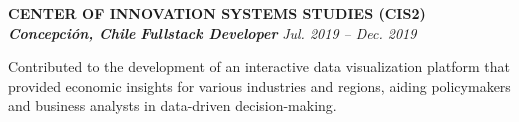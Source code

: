 \item
\headerrow
{\textbf{\uppercase{Center of Innovation Systems Studies (CIS2)}}}
{\textbf{\emph{Concepción, Chile}}}
\headerrow
{\textbf{\emph{Fullstack Developer}}}
{\emph{Jul. 2019 -- Dec. 2019}}
\begin{itemize*}
    \item Contributed to the development of an interactive data visualization platform that provided economic insights for various industries and regions, aiding policymakers and business analysts in data-driven decision-making.
\end{itemize*}